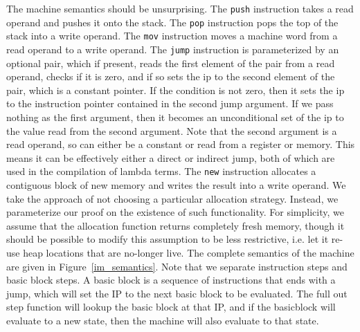 The machine semantics should be unsurprising. The \texttt{push} instruction
takes a read operand and pushes it onto the stack. The \texttt{pop} instruction
pops the top of the stack into a write operand. The \texttt{mov} instruction
moves a machine word from a read operand to a write operand. The \texttt{jump}
instruction is parameterized by an optional pair, which if present, reads 
the first element of the pair from a read operand, checks if it is zero, and if
so sets the ip to the second element of the pair, which is a constant pointer. If the
condition is not zero, then it sets the ip to the instruction pointer contained
in the second jump argument. If we pass nothing as the first argument, then it
becomes an unconditional set of the ip to the value read from the second argument.
Note that the second argument is a read operand, so can either be a constant or
read from a register or memory. This means it can be effectively either a direct
or indirect jump, both of which are used in the compilation of lambda terms. The
\texttt{new} instruction allocates a contiguous block of new memory and writes
the result into a write operand. We take the approach of not choosing a
particular allocation strategy. Instead, we parameterize our proof on the
existence of such functionality. For simplicity, we assume that the allocation
function returns completely fresh memory, though it should be possible to modify
this assumption to be less restrictive, i.e. let it re-use heap locations that
are no-longer live. The complete semantics of the machine are given in
Figure~\ref{im_semantics}. Note that we separate instruction steps and basic
block steps. A basic block is a sequence of instructions that ends with a jump,
which will set the IP to the next basic block to be evaluated. The full out step
function will lookup the basic block at that IP, and if the basicblock will
evaluate to a new state, then the machine will also evaluate to that state. 

